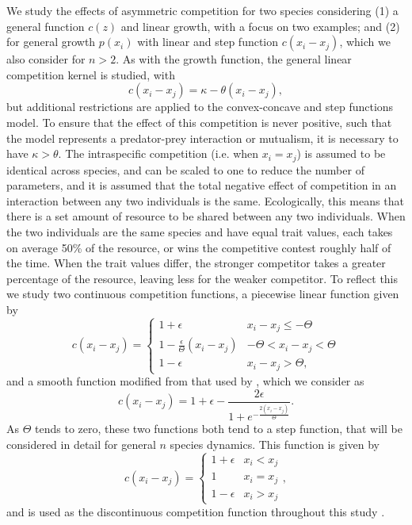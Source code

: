 We study the effects of asymmetric competition for two species considering (1) a general function $c(z)$ and linear growth, with a focus on two examples; and (2) for general growth  $p(x_i)$ with linear and step function $c(x_i - x_j)$, which we also consider for $n>2$. As with the growth function, the general linear competition kernel is studied, with
 \begin{equation}
 \label{linearc}
 c(x_i - x_j)=\kappa - \theta (x_i - x_j),
 \end{equation}
but additional restrictions are applied to the convex-concave and step functions model. To ensure that the effect of this competition is never positive, such that the model represents a predator-prey interaction or mutualism, it is necessary to have $\kappa>\theta$. The intraspecific competition (i.e. when $x_i=x_j$) is assumed to be identical across species, and can be scaled to one to reduce the number of parameters, and it is assumed that the total negative effect of competition in an interaction between any two individuals is the same. Ecologically, this means that there is a set amount of resource to be shared between any two individuals. When the two individuals are the same species and have equal trait values, each takes on average 50\% of the resource, or wins the competitive contest roughly half of the time. When the trait values differ, the stronger competitor takes a greater percentage of the resource, leaving less for the weaker competitor. To reflect this we study two continuous competition functions, a piecewise linear function given by 
\begin{equation}
\label{pwlcomp}
c(x_i-x_j)=\begin{cases}
1+\epsilon & x_i-x_j\leq-\Theta \\
1-\frac{\epsilon}{\Theta}(x_i-x_j) & -\Theta<x_i-x_j<\Theta \\
1-\epsilon & x_i-x_j >\Theta, 
\end{cases}
\end{equation}
and a smooth function modified from that used by \cite{kisdi1999evolutionary}, which we consider as
\begin{equation}
\label{kisdimodified}
c(x_i-x_j)=1+\epsilon -\frac{2\epsilon}{1+e^{-\frac{2(x_i-x_j)}{\Theta}}}.
\end{equation}
As $\Theta$ tends to zero, these two functions both tend to a step function, that will be considered in detail for general $n$ species dynamics. This  function is given by
 \begin{equation}
 \label{stepc}
 c(x_i - x_j)=\begin{cases}
 1+\epsilon & x_i <x_j \\
 1 & x_i = x_j \\
 1-\epsilon & x_i > x_j
 \end{cases},
 \end{equation}
and is used as the discontinuous competition function throughout this study \citep[see also ][]{tilman1994competition, may1994superinfection}.
 
